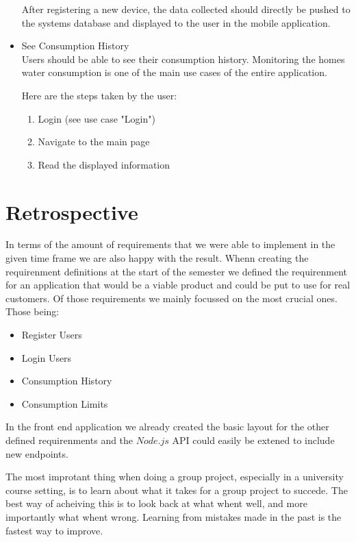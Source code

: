 \documentclass[10pt]{article}
\begin{document}
\begin{multicols*}{2}
\begin{itemize}
  After registering a new device, the data collected should directly be pushed to the systems database and displayed to the user in the mobile application.

  \item {See Consumption History} \\
  Users should be able to see their consumption history. Monitoring the homes water consumption is one of the main use cases of the entire application.

  Here are the steps taken by the user:
  \begin{enumerate}
    \item Login (see use case "Login")
    \item Navigate to the main page
    \item Read the displayed information
  \end{enumerate}

\end{itemize}

\clearpage 

\section{Retrospective}

In terms of the amount of requirements that we were able to implement in the given time frame we are also happy with the result. Whenn creating the requirenment definitions at the start of the semester we defined the requirenment for an application that would be a viable product and could be put to use for real customers. Of those requirements we mainly focussed on the most crucial ones.\\
Those being:
\begin{itemize}
  \item Register Users
  \item Login Users
  \item Consumption History
  \item Consumption Limits
\end{itemize}

In the front end application we already created the basic layout for the other defined requirenments and the $Node.js$ API could easily be extened to include new endpoints.

The most improtant thing when doing a group project, especially in a university course setting, is to learn about what it takes for a group project to succede.
The best way of acheiving this is to look back at what whent well, and more importantly what whent wrong. Learning from mistakes made in the past is the fastest way to improve.\\


\end{multicols*}
\end{document}

